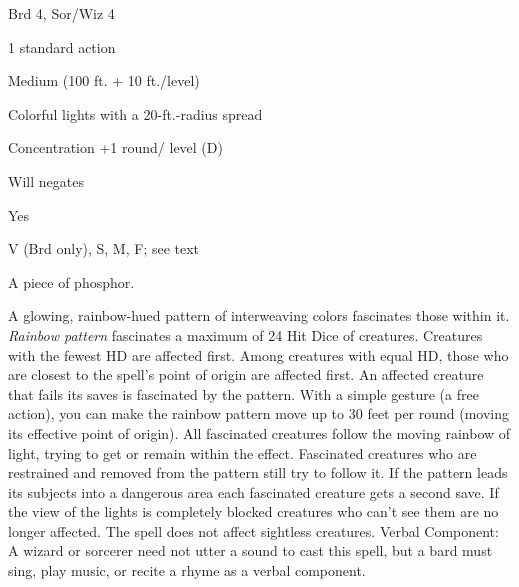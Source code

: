 
\begin{description*}
\item[Level:] Brd 4, Sor/Wiz 4
\item[Casting Time:] 1 standard action
\item[Range:] Medium (100 ft. + 10 ft./level)
\item[Effect:] Colorful lights with a 20-ft.-radius spread
\item[Duration:] Concentration +1 round/ level (D)
\item[Saving Throw:] Will negates
\item[Spell Resistance:] Yes
\item[Components:] V (Brd only), S, M, F; see text
\item[Arcane Material Component:] A piece of phosphor.
\end{description*}

A glowing, rainbow-hued pattern of interweaving colors fascinates those within
it. \textit{Rainbow pattern} fascinates a maximum of 24 Hit Dice of creatures.
Creatures with the fewest HD are affected first. Among creatures with equal HD,
those who are closest to the spell's point of origin are affected first. An affected
creature that fails its saves is fascinated by the pattern.
With a simple gesture (a free action), you can make the rainbow pattern move up
to 30 feet per round (moving its effective point of origin). All fascinated creatures
follow the moving rainbow of light, trying to get or remain within the effect.
Fascinated creatures who are restrained and removed from the pattern still try
to follow it. If the pattern leads its subjects into a dangerous area each fascinated
creature gets a second save. If the view of the lights is completely blocked creatures
who can't see them are no longer affected.
The spell does not affect sightless creatures.
Verbal Component: A wizard or sorcerer need not utter a sound to cast
this spell, but a bard must sing, play music, or recite a rhyme as a verbal component.